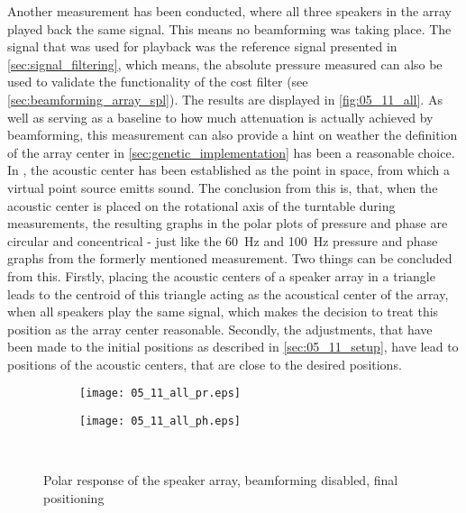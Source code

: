 Another measurement has been conducted, where all three speakers in the array played back the same signal. This means no beamforming was taking place. The signal that was used for playback was the reference signal presented in \autoref{sec:signal_filtering}, which means, the absolute pressure measured can also be used to validate the functionality of the cost filter (see \autoref{sec:beamforming_array_spl}). The results are displayed in \autoref{fig:05_11_all}. As well as serving as a baseline to how much attenuation is actually achieved by beamforming, this measurement can also provide a hint on weather the definition of the array center in \autoref{sec:genetic_implementation} has been a reasonable choice.
In \label{sec:ac_center}, the acoustic center has been established as the point in space, from which a virtual point source emitts sound. The conclusion from this is, that, when the acoustic center is placed on the rotational axis of the turntable during measurements, the resulting graphs in the polar plots of pressure and phase are circular and concentrical - just like the \SI{60}{\hertz} and \SI{100}{\hertz} pressure and phase graphs from the formerly mentioned measurement. 
Two things can be concluded from this. Firstly, placing the acoustic centers of a speaker array in a triangle leads to the centroid of this triangle acting as the acoustical center of the array, when all speakers play the same signal, which makes the decision to treat this position as the array center reasonable. Secondly, the adjustments, that have been made to the initial positions as described in \autoref{sec:05_11_setup}, have lead to positions of the acoustic centers, that are close to the desired positions.

\begin{figure}[h]
\begin{subfigure}[c]{0.5\textwidth}
\texttt{[image: 05\_11\_all\_pr.eps]}
\label{fig:05_11_all_pr}
\end{subfigure}
\begin{subfigure}[c]{0.5\textwidth}
\texttt{[image: 05\_11\_all\_ph.eps]}
\label{fig:05_11_all_ph}
\end{subfigure}\\
\caption{Polar response of the speaker array, beamforming disabled, final positioning}  
\label{fig:05_11_all}
\end{figure}

